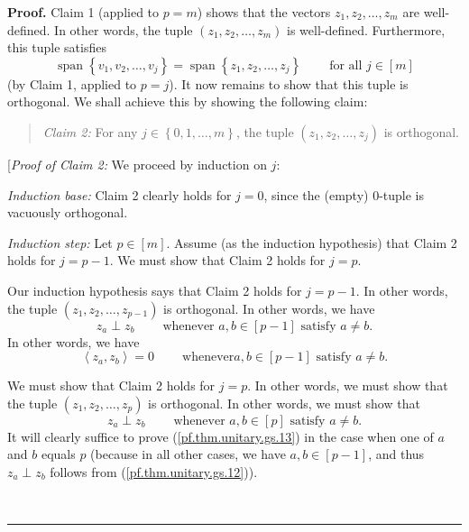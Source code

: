 \documentclass[numbers=enddot,12pt,final,onecolumn,notitlepage]{scrartcl}%
\numberwithin{exer}{subsection}
\theoremstyle{definition}
\newenvironment{statement}{\begin{quote}}{\end{quote}}
\newenvironment{proof}[1][Proof]{\noindent\textbf{#1.} }{\ \rule{0.5em}{0.5em}}
\begin{document}
\begin{proof}
Claim 1 (applied to $p=m$) shows that the vectors $z_{1},z_{2},\ldots,z_{m}$
are well-defined. In other words, the tuple $\left(  z_{1},z_{2},\ldots
,z_{m}\right)  $ is well-defined. Furthermore, this tuple satisfies%
\[
\operatorname*{span}\left\{  v_{1},v_{2},\ldots,v_{j}\right\}
=\operatorname*{span}\left\{  z_{1},z_{2},\ldots,z_{j}\right\}
\ \ \ \ \ \ \ \ \ \ \text{for all }j\in\left[  m\right]
\]
(by Claim 1, applied to $p=j$). It now remains to show that this tuple is
orthogonal. We shall achieve this by showing the following claim:

\begin{statement}
\textit{Claim 2:} For any $j\in\left\{  0,1,\ldots,m\right\}  $, the tuple
$\left(  z_{1},z_{2},\ldots,z_{j}\right)  $ is orthogonal.
\end{statement}

[\textit{Proof of Claim 2:} We proceed by induction on $j$:

\textit{Induction base:} Claim 2 clearly holds for $j=0$, since the (empty)
$0$-tuple is vacuously orthogonal.

\textit{Induction step:} Let $p\in\left[  m\right]  $. Assume (as the
induction hypothesis) that Claim 2 holds for $j=p-1$. We must show that Claim
2 holds for $j=p$.

Our induction hypothesis says that Claim 2 holds for $j=p-1$. In other words,
the tuple $\left(  z_{1},z_{2},\ldots,z_{p-1}\right)  $ is orthogonal. In
other words, we have%
\begin{equation}
z_{a}\perp z_{b}\ \ \ \ \ \ \ \ \ \ \text{whenever }a,b\in\left[  p-1\right]
\text{ satisfy }a\neq b. \label{pf.thm.unitary.gs.12}%
\end{equation}
In other words, we have%
\begin{equation}
\left\langle z_{a},z_{b}\right\rangle =0\ \ \ \ \ \ \ \ \ \ \text{whenever
}a,b\in\left[  p-1\right]  \text{ satisfy }a\neq b.
\label{pf.thm.unitary.gs.12b}%
\end{equation}


We must show that Claim 2 holds for $j=p$. In other words, we must show that
the tuple $\left(  z_{1},z_{2},\ldots,z_{p}\right)  $ is orthogonal. In other
words, we must show that%
\begin{equation}
z_{a}\perp z_{b}\ \ \ \ \ \ \ \ \ \ \text{whenever }a,b\in\left[  p\right]
\text{ satisfy }a\neq b. \label{pf.thm.unitary.gs.13}%
\end{equation}
It will clearly suffice to prove (\ref{pf.thm.unitary.gs.13}) in the case when
one of $a$ and $b$ equals $p$ (because in all other cases, we have
$a,b\in\left[  p-1\right]  $, and thus $z_{a}\perp z_{b}$ follows from
(\ref{pf.thm.unitary.gs.12})).


\end{proof}
\end{document}
